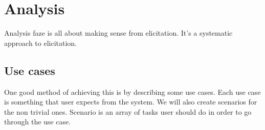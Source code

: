 \section{Analysis}
Analysis faze is all about making sense from elicitation. It's a systematic approach to elicitation.
\subsection{Use cases}
One good method of achieving this is by describing some use cases. Each use case is something that user expects from the system. We will also create scenarios for the non trivial ones. Scenario is an array of tasks user should do in order to go through the use case.

